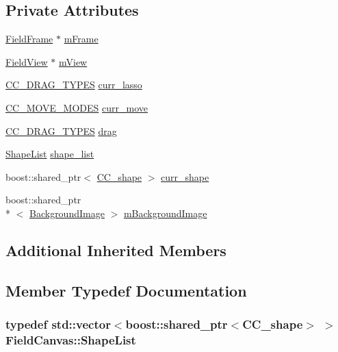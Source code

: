\subsection*{Private Attributes}
\begin{DoxyCompactItemize}
\item 
\hyperlink{a00102}{Field\-Frame} $\ast$ \hyperlink{a00101_a4eb19251de05b63c1d024907670b97a3}{m\-Frame}
\item 
\hyperlink{a00103}{Field\-View} $\ast$ \hyperlink{a00101_a8708bee382612444a5e4472f50b848bf}{m\-View}
\item 
\hyperlink{a00216_a0fc7c44466a98380192d425c98f22aa6}{C\-C\-\_\-\-D\-R\-A\-G\-\_\-\-T\-Y\-P\-E\-S} \hyperlink{a00101_a3dbc2249198dc4da9c1a3b7c9537be02}{curr\-\_\-lasso}
\item 
\hyperlink{a00216_a45558d38ac05e98ebdbffa5756372654}{C\-C\-\_\-\-M\-O\-V\-E\-\_\-\-M\-O\-D\-E\-S} \hyperlink{a00101_a50098874a6bb9a9014397a8142d72fd0}{curr\-\_\-move}
\item 
\hyperlink{a00216_a0fc7c44466a98380192d425c98f22aa6}{C\-C\-\_\-\-D\-R\-A\-G\-\_\-\-T\-Y\-P\-E\-S} \hyperlink{a00101_ac8199a91ba09448c31f2c20e9acc0228}{drag}
\item 
\hyperlink{a00101_a6a92f4fe3444b93e6556b35da0a7e964}{Shape\-List} \hyperlink{a00101_a7560c79cbde29e0719d7aa2949b076f4}{shape\-\_\-list}
\item 
boost\-::shared\-\_\-ptr$<$ \hyperlink{a00037}{C\-C\-\_\-shape} $>$ \hyperlink{a00101_accf1c526ef4caf9ec999fc61c57e0771}{curr\-\_\-shape}
\item 
boost\-::shared\-\_\-ptr\\*
$<$ \hyperlink{a00017}{Background\-Image} $>$ \hyperlink{a00101_ad2471426f32f860c684282a7d46e36db}{m\-Background\-Image}
\end{DoxyCompactItemize}
\subsection*{Additional Inherited Members}


\subsection{Member Typedef Documentation}
\hypertarget{a00101_a6a92f4fe3444b93e6556b35da0a7e964}{
\subsubsection[{Shape\-List}]{\setlength{\rightskip}{0pt plus 5cm}typedef std\-::vector$<$boost\-::shared\-\_\-ptr$<${\bf C\-C\-\_\-shape}$>$ $>$ {\bf Field\-Canvas\-::\-Shape\-List}\hspace{0.3cm}{\ttfamily [private]}}}\label{a00101_a6a92f4fe3444b93e6556b35da0a7e964}


